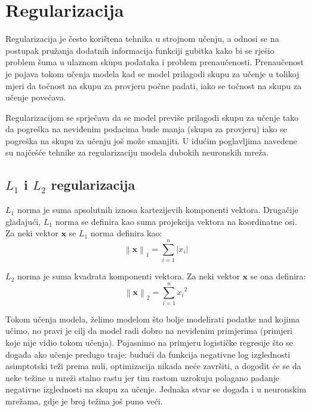 \documentclass[times, utf8, diplomski, numeric]{fer}
\newcommand{\norm}[1]{\left\lVert#1\right\rVert}
\newcommand{\abs}[1]{\left\lvert#1\right\rvert}
\begin{document}
\section{Regularizacija}

Regularizacija je često korištena tehnika u strojnom učenju, a odnosi se na postupak pružanja dodatnih informacija funkciji gubitka kako bi se rješio problem šuma u ulaznom skupu podataka i problem prenaučenosti. Prenaučenost je pojava tokom učenja modela kad se model prilagodi skupu za učenje u tolikoj mjeri da točnost na skupu za provjeru  počne padati, iako se točnost na skupu za učenje povećava.

Regularizacijom se sprječava da se model previše prilagodi skupu za učenje tako da pogreška na neviđenim podacima bude manja (skupu za provjeru) iako se pogreška na skupu za učenju još može smanjiti. U idućim poglavljima navedene su najčešće tehnike za regularizaciju modela dubokih neuronskih mreža.

\subsection{$L_1$ i $L_2$ regularizacija}

$L_1$ norma je suma apsolutnih iznosa kartezijevih komponenti vektora. Drugačije gladajući, $L_1$ norma se definira kao suma projekcija vektora na koordinatne osi. Za neki vektor $\boldsymbol{x}$ se $L_1$ norma definira kao:
\begin{equation}
\norm{\boldsymbol{x}}_1 = \sum_{i = 1}^{n} \abs{x_i}
\end{equation}

$L_2$ norma je suma kvadrata komponenti vektora. Za neki vektor $\boldsymbol{x}$ se ona definira:
\begin{equation}
\norm{\boldsymbol{x}}_2 = \sum_{i = 1}^{n} {x_i}^2
\end{equation}

Tokom učenja modela, želimo modelom što bolje modelirati podatke nad kojima učimo, no pravi je cilj da model radi dobro na neviđenim primjerima (primjeri koje nije vidio tokom učenja). Pojasnimo na primjeru logističke regresije što se događa ako učenje predugo traje: budući da funkcija negativne log izglednosti asimptotski teži prema nuli, optimizacija nikada neće završiti, a dogodit će se da neke težine u mreži stalno rastu jer tim rastom uzrokuju polagano padanje negativne izglednosti na skupu za učenje. Jednaka stvar se događa i u neuronskim mrežama, gdje je broj težina još puno veći.
\end{document}
